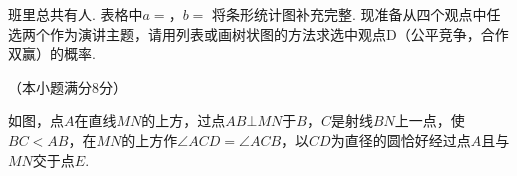\documentclass[10pt]{article}
\begin{document}
\begin{questions}{\answeringintroduction}
    \begin{figure}[!htb]
        \centering
        \qquad \qquad
    \end{figure}
    \begin{subquestions}
        \subquestion 班里总共有\complitingline 人.
        \subquestion 表格中$a=$\complitingline，$b=$\complitingline
        \subquestion 将条形统计图补充完整.
        \subquestion 现准备从四个观点中任选两个作为演讲主题，请用列表或画树状图的方法求选中观点D（公平竞争，合作双赢）的概率.
    \end{subquestions}
    \question （本小题满分8分）\par
    如图，点$A$在直线$MN$的上方，过点$AB \bot MN$于$B$，$C$是射线$BN$上一点，使$BC < AB$，在$MN$的上方作$\angle ACD=\angle ACB$，以$CD$为直径的圆恰好经过点$A$且与$MN$交于点$E$.

\end{questions}
\end{document}
